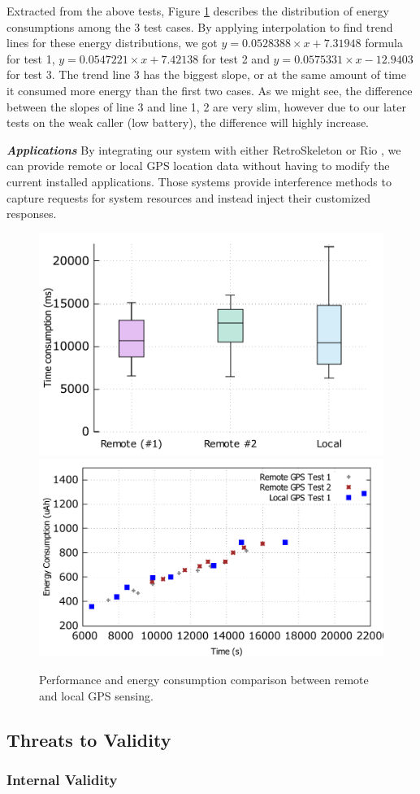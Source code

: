\documentclass{sig-alternate}[10pt]
\begin{document}
Extracted from the above tests, Figure \ref{fig:gps_perf} describes the distribution of energy consumptions among the 3 test cases. By applying interpolation to find trend lines for these energy distributions, we got $y = 0.0528388 \times x + 7.31948$ formula for test 1, $y = 0.0547221 \times x + 7.42138$ for test 2 and $y = 0.0575331 \times x - 12.9403$ for test 3. The trend line 3 has the biggest slope, or at the same amount of time it consumed more energy than the first two cases. As we might see, the difference between the slopes of line 3 and line 1, 2 are very slim, however due to our later tests on the weak caller (low battery), the difference will highly increase. 

\textbf{\emph{Applications}}
By integrating our system with either RetroSkeleton \cite{retro-skel} or Rio \cite{rio}, we can provide remote or local GPS location data without having to modify the current installed applications. Those systems provide interference methods to capture requests for system resources and instead inject their customized responses. 

\begin{figure}
	\centering
		\includegraphics[width=.42\textwidth]{data/gps_perf.pdf}
		\includegraphics[width=.47\textwidth]{data/gps_energy_full.pdf}
	\caption{Performance and energy consumption comparison between remote and local GPS sensing.}
	\label{fig:gps_perf}
\end{figure}

\subsection{Threats to Validity}
\subsubsection{Internal Validity}
\end{document}

